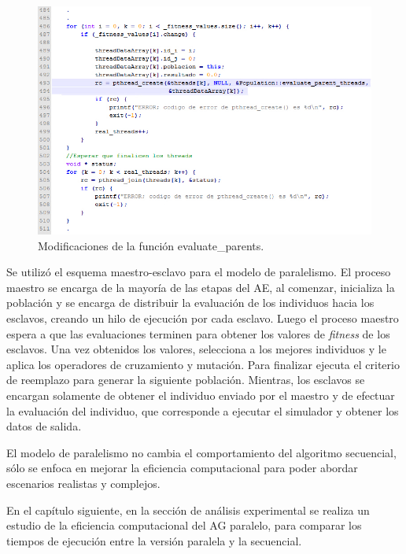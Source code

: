 \begin{figure}[H]
	\centering
	\includegraphics[width=1\linewidth]{Figures/codigo2}
	\caption{Modificaciones de la función evaluate{\_}parents.}
	\label{fig:codigo2}
\end{figure}		

Se utilizó el esquema maestro-esclavo para el modelo de paralelismo. El proceso maestro se encarga de la mayoría de las etapas del AE, al comenzar, inicializa la población y se encarga de distribuir la evaluación de los individuos hacia los esclavos, creando un hilo de ejecución por cada esclavo. Luego el proceso maestro espera a que las evaluaciones terminen para obtener los valores de \emph{fitness} de los esclavos. Una vez obtenidos los valores, selecciona a los mejores individuos y le aplica los operadores de cruzamiento y mutación. Para finalizar ejecuta el criterio de reemplazo para generar la siguiente población. Mientras, los esclavos se encargan solamente de obtener el individuo enviado por el maestro y de efectuar la evaluación del individuo, que corresponde a ejecutar el simulador y obtener los datos de salida. 


El modelo de paralelismo no cambia el comportamiento del algoritmo secuencial, sólo se enfoca en mejorar la eficiencia computacional para poder abordar escenarios realistas y complejos.

En el capítulo siguiente, en la sección de análisis experimental se realiza un estudio de la eficiencia computacional del AG paralelo, para comparar los tiempos de ejecución entre la versión paralela y la secuencial.